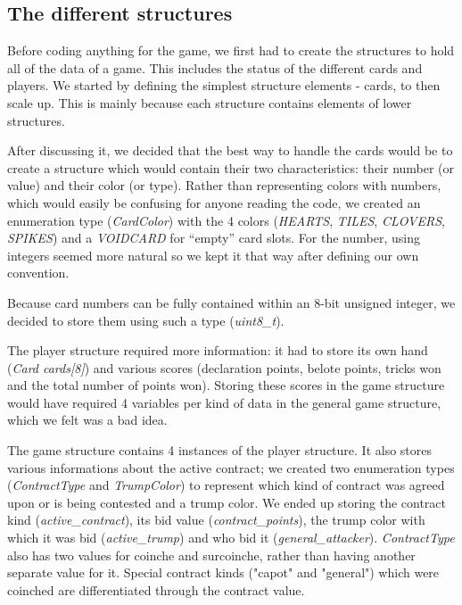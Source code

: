 \documentclass[12pt]{article}
\begin{document}
\subsection{The different structures}

Before coding anything for the game, we first had to create the structures to hold all of the data of a game. This includes the status of the different cards and players.
We started by defining the simplest structure elements - cards, to then scale up. This is mainly because each structure contains elements of lower structures.

After discussing it, we decided that the best way to handle the cards would be to create a structure which would contain their two characteristics: their number (or value) and their color (or type).
Rather than representing colors with numbers, which would easily be confusing for anyone reading the code, we created an enumeration type (\textit{CardColor}) with the 4 colors (\textit{HEARTS}, \textit{TILES}, \textit{CLOVERS}, \textit{SPIKES}) and a \textit{VOIDCARD} for ``empty'' card slots.
For the number, using integers seemed more natural so we kept it that way after defining our own convention.

Because card numbers can be fully contained within an 8-bit unsigned integer, we decided to store them using such a type (\textit{uint8\_t}).

The player structure required more information: it had to store its own hand (\textit{Card cards[8]}) and various scores (declaration points, belote points, tricks won and the total number of points won).
Storing these scores in the game structure would have required 4 variables per kind of data in the general game structure, which we felt was a bad idea.

The game structure contains 4 instances of the player structure.
It also stores various informations about the active contract; we created two enumeration types (\textit{ContractType} and \textit{TrumpColor}) to represent which kind of contract was agreed upon or is being contested and a trump color.
We ended up storing the contract kind (\textit{active\_contract}), its bid value (\textit{contract\_points}), the trump color with which it was bid (\textit{active\_trump}) and who bid it (\textit{general\_attacker}).
\textit{ContractType} also has two values for coinche and surcoinche, rather than having another separate value for it. Special contract kinds ("capot" and "general") which were coinched are differentiated through the contract value.
\end{document}
